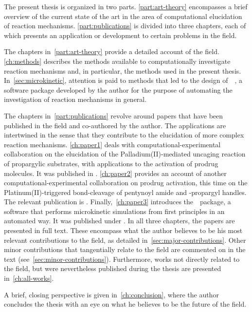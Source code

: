 The present thesis is organized in two parts.
\cref{part:art-theory}
encompasses a brief overview of the current state of the art in the area of
computational elucidation of reaction mechanisms.
\cref{part:publications} is divided into three chapters,
each of which
presents an application or development to certain problems in the field.

The chapters in~\cref{part:art-theory} provide a detailed account of the
field.
\cref{ch:methods} describes the methods available to computationally
investigate reaction mechanisms and,
in particular,
the methods used in the
present thesis.
In~\cref{sec:microkinetic},
attention is paid to methods that led to the design
of~\overreact{}~\cite{Schneider_2022,overreact2021zenodo},
a software package developed by the
author for the purpose of automating the investigation of reaction mechanisms
in general.

The chapters in~\cref{part:publications} revolve around papers that have
been published in the field and co-authored by the author.
The applications are intertwined in the sense
that they contribute to the elucidation of more complex reaction mechanisms.
\cref{ch:paper1} deals with
computational-experimental collaboration on the elucidation
of the Palladium(II)-mediated uncaging reaction of propargylic substrates,
with applications to the activation of prodrug molecules.\@
It was published in
.
\cref{ch:paper2} provides an account of
another computational-experimental collaboration on prodrug activation,
this time on the Platinum(II)-triggered bond-cleavage
of pentynoyl amide and -propargyl handles.\@
The relevant publication is
.
Finally,~\cref{ch:paper3} introduces the~\overreact{}~package,
a software that performs microkinetic simulations
from first principles in an automated way.\@
It was published under
.
In all three chapters,
the papers are presented in full text.
These encompass what the author believes to be his most relevant
contributions to the field,
as detailed in~\cref{sec:major-contributions}.
Other minor contributions that tangentially relate to the field are commented
on in the text (see~\cref{sec:minor-contributions}).
Furthermore,
works not directly related to the
field,
but were nevertheless published during the thesis are
presented in~\cref{ch:all-works}.

A brief,
closing perspective is given in~\cref{ch:conclusion},
where
the author concludes the thesis with an eye on what he believes to be the
future of the field.
